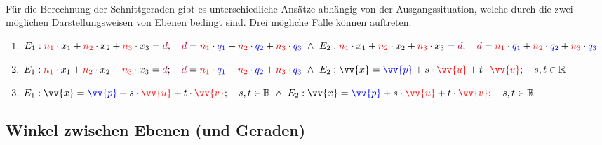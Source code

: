 \documentclass[main.tex]{subfiles}
\begin{document}
        \paragraph{} Für die Berechnung der Schnittgeraden gibt es unterschiedliche Ansätze abhängig von der
        Ausgangssituation, welche durch die zwei möglichen Darstellungsweisen von Ebenen bedingt sind. Drei mögliche
        Fälle können auftreten:
        \begin{enumerate}[1)]
            \item $E_1:\textcolor{red}{n_1} \cdot x_1 + \textcolor{red}{n_2} \cdot x_2 + \textcolor{red}{n_3} \cdot x_3 = \textcolor{purple}{d} ; \quad \textcolor{purple}{d} = \textcolor{red}{n_1} \cdot \textcolor{blue}{q_1} + \textcolor{red}{n_2} \cdot \textcolor{blue}{q_2} + \textcolor{red}{n_3} \cdot \textcolor{blue}{q_3} \text{ } \land \text{ } E_2:\textcolor{red}{n_1} \cdot x_1 + \textcolor{red}{n_2} \cdot x_2 + \textcolor{red}{n_3} \cdot x_3 = \textcolor{purple}{d} ; \quad \textcolor{purple}{d} = \textcolor{red}{n_1} \cdot \textcolor{blue}{q_1} + \textcolor{red}{n_2} \cdot \textcolor{blue}{q_2} + \textcolor{red}{n_3} \cdot \textcolor{blue}{q_3}$
            \item $E_1:\textcolor{red}{n_1} \cdot x_1 + \textcolor{red}{n_2} \cdot x_2 + \textcolor{red}{n_3} \cdot x_3 = \textcolor{purple}{d} ; \quad \textcolor{purple}{d} = \textcolor{red}{n_1} \cdot \textcolor{blue}{q_1} + \textcolor{red}{n_2} \cdot \textcolor{blue}{q_2} + \textcolor{red}{n_3} \cdot \textcolor{blue}{q_3} \text{ } \land \text{ } E_2:\vv{x}=\textcolor{blue}{\vv{p}} + s\cdot \textcolor{red}{\vv{u}} + t\cdot \textcolor{red}{\vv{v}};\quad s,t\in\R$
            \item $E_1:\vv{x}=\textcolor{blue}{\vv{p}} + s\cdot \textcolor{red}{\vv{u}} + t\cdot \textcolor{red}{\vv{v}};\quad s,t\in\R \text{ } \land \text{ } E_2:\vv{x}=\textcolor{blue}{\vv{p}} + s\cdot \textcolor{red}{\vv{u}} + t\cdot \textcolor{red}{\vv{v}};\quad s,t\in\R$
        \end{enumerate}


    \subsection{Winkel zwischen Ebenen (und Geraden)}
\end{document}
